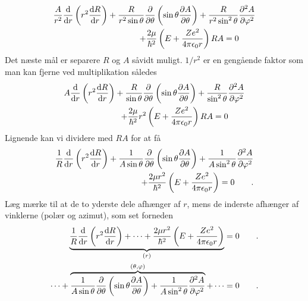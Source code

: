 \documentclass[12pt]{article}
\theoremstyle{definition}
\theoremstyle{remark}
\theoremstyle{definition}
\numberwithin{equation}{section}
\begin{document}
\begin{align}
\begin{split}
    \frac{A}{r^2}\frac{\rm d}{{\rm d}r}\left(r^2\frac{{\rm d}R}{{\rm d}r}\right)+\frac{R}{r^2\sin\theta}\frac{\partial}{\partial\theta}\left(\sin\theta\frac{\partial A}{\partial\theta}\right)+\frac{R}{r^2\sin^2\theta}\frac{\partial^2A}{\partial\varphi^2}
    \\+\frac{2\mu}{\hbar^2}\left(E+\frac{Ze^2}{4\pi\epsilon_0r}\right)RA=0\qquad
\end{split}
\end{align}
Det næste mål er separere $R$ og $A$ såvidt muligt. $1/r^2$ er en gengående faktor som man kan fjerne ved multiplikation således
\begin{align}
\begin{split}
    A\frac{\rm d}{{\rm d}r}\left(r^2\frac{{\rm d}R}{{\rm d}r}\right)
    +\frac{R}{\sin\theta}\frac{\partial}{\partial\theta}\left(\sin\theta\frac{\partial A}{\partial\theta}\right)
    +\frac{R}{\sin^2\theta}\frac{\partial^2A}{\partial\varphi^2}
    \\
    +\frac{2\mu}{\hbar^2}r^2\left(E+\frac{Ze^2}{4\pi\epsilon_0r}\right)RA=0\qquad
\end{split}
\end{align}
Lignende kan vi dividere med $RA$ for at få
\begin{align}
    \begin{split}
        \frac{1}{R}\frac{\rm d}{{\rm d}r}\left(r^2\frac{{\rm d}R}{{\rm d}r}\right)
        +\frac{1}{A\sin\theta}\frac{\partial}{\partial\theta}\left(\sin\theta\frac{\partial A}{\partial\theta}\right)
        +\frac{1}{A\sin^2\theta}\frac{\partial^2A}{\partial\varphi^2}
        \\
        +\frac{2\mu r^2}{\hbar^2}\left(E+\frac{Ze^2}{4\pi\epsilon_0r}\right)
        =0\qquad.
    \end{split}
\end{align}
Læg mærke til at de to yderste dele afhænger af $r$, mens de inderste afhænger af vinklerne (polær og azimut), som set forneden
\begin{align}
    \begin{split}
        \underbrace{\frac{1}{R}\frac{\rm d}{{\rm d}r}\left(r^2\frac{{\rm d}R}{{\rm d}r}\right)
        +\dots+\frac{2\mu r^2}{\hbar^2}\left(E+\frac{Ze^2}{4\pi\epsilon_0r}\right)}_{(r)}
        =0\qquad.
        \\
        \dots
        +\overbrace{\frac{1}{A\sin\theta}\frac{\partial}{\partial\theta}\left(\sin\theta\frac{\partial A}{\partial\theta}\right)
        +\frac{1}{A\sin^2\theta}\frac{\partial^2A}{\partial\varphi^2}}^{(\theta, \varphi)}+\dots
        =0\qquad.
    \end{split}
\end{align}
\end{document}
